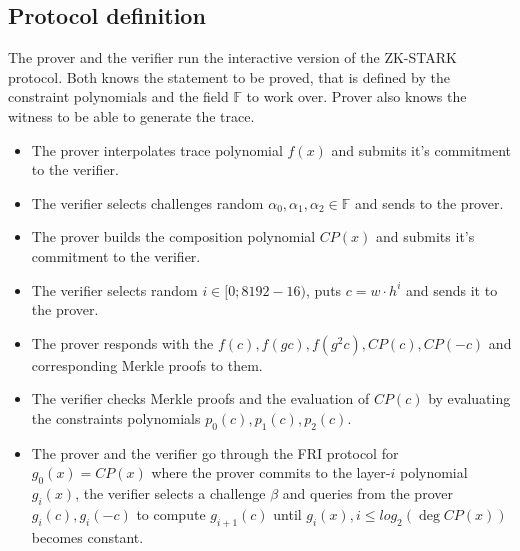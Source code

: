 \documentclass[../lecture-notes.tex]{subfiles}
\begin{document}
\subsection{Protocol definition}

\begin{tcolorbox}[title=Interactive ZK-STARK protocol,
    colback=blue!5!white,
    colframe=blue!75!black,
    colbacktitle=blue!25!white,
    coltitle=blue!20!black,
    fonttitle=\bfseries,
    boxrule=1.25pt,
    subtitle style={boxrule=0pt,
    colback=blue!20!white,
    colupper=blue!75!gray} ]
    \small

    The prover and the verifier run the interactive version of the ZK-STARK protocol. Both knows the statement to be proved, that is defined by the constraint polynomials and the field $\mathbb{F}$ to work over. Prover also knows the witness to be able to generate the trace.

    \begin{itemize}[label=]
        \item The prover interpolates trace polynomial $f(x)$ and submits it's commitment to the verifier.
        \item The verifier selects challenges random $\alpha_0, \alpha_1, \alpha_2 \in \mathbb{F}$ and sends to the prover.
        \item The prover builds the composition polynomial $CP(x)$ and submits it's commitment to the verifier.
    \end{itemize}

    \begin{itemize}[label=]
        \item The verifier selects random $i \in [0; 8192-16)$, puts $c = w\cdot h^i$ and sends it to the prover.
        \item The prover responds with the $f(c), f(gc), f(g^2c), CP(c), CP(-c)$ and corresponding Merkle proofs to them.
        \item The verifier checks Merkle proofs and the evaluation of $CP(c)$ by evaluating the constraints polynomials $p_0(c), p_1(c), p_2(c)$.
        \item The prover and the verifier go through the FRI protocol for $g_0(x) = CP(x)$ where the prover commits to the layer-$i$ polynomial $g_i(x)$, the verifier selects a challenge $\beta$ and queries from the prover $g_i(c), g_i(-c)$ to compute $g_{i+1}(c)$ until $g_i(x), i \leq log_2(\deg CP(x))$ becomes constant.
    \end{itemize}
    
\end{tcolorbox}
\end{document}
